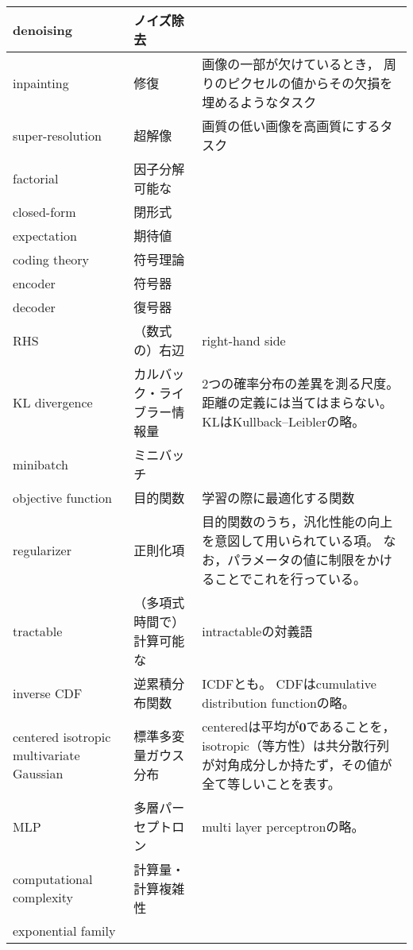 \documentclass[dvipdfmx, fleqn]{jsarticle}
\begin{document}
\begin{longtable}{lp{4cm}p{7cm}}
        denoising
            & ノイズ除去
            & 
            \tabularnewline \hline
        inpainting
            & 修復
            & 画像の一部が欠けているとき，
            周りのピクセルの値からその欠損を埋めるようなタスク
            \tabularnewline \hline
        super-resolution
            & 超解像
            & 画質の低い画像を高画質にするタスク
            \tabularnewline \hline
        factorial
            & 因子分解可能な
            & 
            \tabularnewline \hline
        closed-form
            & 閉形式
            & 
            \tabularnewline \hline
        expectation
            & 期待値
            & 
            \tabularnewline \hline
        coding theory
            & 符号理論
            & 
            \tabularnewline \hline
        encoder
            & 符号器
            & 
            \tabularnewline \hline
        decoder
            & 復号器
            & 
            \tabularnewline \hline
        RHS
            & （数式の）右辺
            & right-hand side
            \tabularnewline \hline
        KL divergence
            & カルバック・ライブラー情報量
            & 2つの確率分布の差異を測る尺度。
            距離の定義には当てはまらない。
            KLはKullback–Leiblerの略。
            \tabularnewline \hline
        minibatch
            & ミニバッチ
            & 
            \tabularnewline \hline
        objective function
            & 目的関数
            & 学習の際に最適化する関数
            \tabularnewline \hline
        regularizer
            & 正則化項
            & 目的関数のうち，汎化性能の向上を意図して用いられている項。
            なお，パラメータの値に制限をかけることでこれを行っている。
            \tabularnewline \hline
        tractable
            & （多項式時間で）計算可能な
            & intractableの対義語
            \tabularnewline \hline
        inverse CDF
            & 逆累積分布関数
            & ICDFとも。
            CDFはcumulative distribution functionの略。
            \tabularnewline \hline
        centered isotropic multivariate Gaussian
            & 標準多変量ガウス分布
            & centeredは平均が\(\bm{0}\)であることを，isotropic（等方性）は共分散行列が対角成分しか持たず，その値が全て等しいことを表す。
            \tabularnewline \hline
        MLP
            & 多層パーセプトロン
            & multi layer perceptronの略。
            \tabularnewline \hline
        computational complexity
            & 計算量・計算複雑性
            & 
            \tabularnewline \hline
        exponential family
            & 
            & 
            \tabularnewline \hline

\end{longtable}
\end{document}
